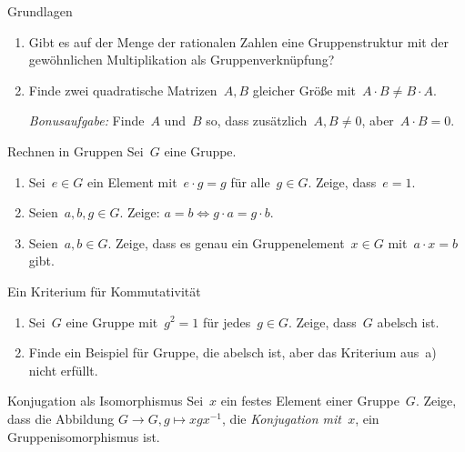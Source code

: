 \documentclass{algblatt}
\begin{document}

\begin{aufgabe}{Grundlagen}
\begin{enumerate}
\item Gibt es auf der Menge der rationalen Zahlen eine Gruppenstruktur mit der
ge\-wöhn\-li\-chen Multiplikation als Gruppenverknüpfung?
\item Finde zwei quadratische Matrizen~$A, B$ gleicher Größe mit~$A \cdot B
\neq B \cdot A$.

\emph{Bonusaufgabe:} Finde~$A$ und~$B$ so, dass zusätzlich~$A,B \neq 0$,
aber~$A \cdot B = 0$.
\end{enumerate}
\end{aufgabe}

\begin{aufgabe}{Rechnen in Gruppen}
Sei~$G$ eine Gruppe.
\begin{enumerate}
\item Sei~$e \in G$ ein Element mit~$e \cdot g = g$ für alle~$g \in G$. Zeige,
dass~$e = 1$.
\item Seien~$a,b,g \in G$. Zeige: $a = b \Longleftrightarrow g \cdot a = g
\cdot b$.
\item Seien~$a,b \in G$. Zeige, dass es genau ein Gruppenelement~$x \in G$
mit~$a \cdot x = b$ gibt.
\end{enumerate}
\end{aufgabe}

\begin{aufgabe}{Ein Kriterium für Kommutativität}
\begin{enumerate}
\item Sei~$G$ eine Gruppe mit~$g^2 = 1$ für jedes~$g \in G$. Zeige, dass~$G$
abelsch ist.
\item Finde ein Beispiel für Gruppe, die abelsch ist, aber das Kriterium aus~a)
nicht erfüllt.
\end{enumerate}
\end{aufgabe}

\begin{aufgabe}{Konjugation als Isomorphismus}
Sei~$x$ ein festes Element einer Gruppe~$G$. Zeige, dass die Abbildung
$G \to G, g \mapsto x g x^{-1}$, die \emph{Konjugation mit~$x$}, ein
Gruppenisomorphismus ist.
\end{aufgabe}
\end{document}
